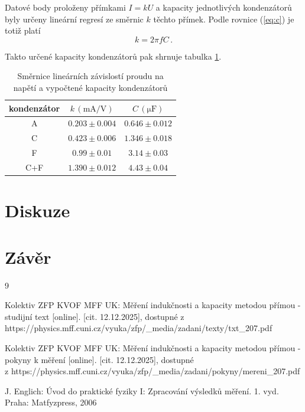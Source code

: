 \documentclass{../concepts/prepareprotokol} %
\begin{document}
Datové body proloženy přímkami $I = k U$ a kapacity jednotlivých kondenzátorů byly určeny lineární regresí ze směrnic $k$ těchto přímek. Podle rovnice (\ref{eq:c}) je totiž platí
\begin{equation} \label{eq:kc}
    k= 2 \pi f C \, .
\end{equation}

Takto určené kapacity kondenzátorů pak shrnuje tabulka \ref{tab:kapacity}.

\begin{table}[!htbp]
\centering
\caption{Směrnice lineárních závislostí proudu na napětí a vypočtené kapacity kondenzátorů}
\begin{tabular}{c|cc}
 \toprule
 kondenzátor & $k\, (\mathrm{mA/V})$ & $C\, (\mathrm{\mu F})$ \\
 \midrule
 A & $0.203 \pm 0.004$ & $0.646 \pm 0.012$ \\
 C & $0.423 \pm 0.006$ & $1.346 \pm 0.018$ \\
 F & $0.99 \pm 0.01$ & $3.14 \pm 0.03$ \\
 C+F & $1.390 \pm 0.012$ & $4.43 \pm 0.04$ \\
 \bottomrule
\end{tabular}
\label{tab:kapacity}
\end{table}

\section{Diskuze}


\section{Závěr}


\begin{thebibliography}{9}

 Kolektiv ZFP KVOF MFF UK: Měření indukčnosti a kapacity metodou přímou - studijní text [online]. [cit. 12.12.2025], dostupné z https://physics.mff.cuni.cz/vyuka/zfp/\_media/zadani/texty/txt\_207.pdf

 Kolektiv ZFP KVOF MFF UK: Měření indukčnosti a kapacity metodou přímou - pokyny k měření [online]. [cit. 12.12.2025], dostupné \\
z https://physics.mff.cuni.cz/vyuka/zfp/\_media/zadani/pokyny/mereni\_207.pdf

 J. Englich: Úvod do praktické fyziky I: Zpracování výsledků měření. 1. vyd. Praha: Matfyzpress, 2006

\end{thebibliography}
\end{document}
